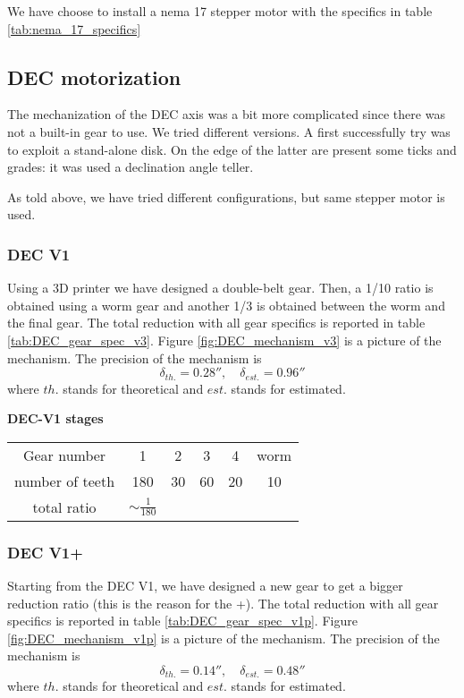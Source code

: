 We have choose to install a nema 17 stepper motor with the specifics in table \ref{tab:nema_17_specifics}

\subsection{DEC motorization}
The mechanization of the DEC axis was a bit more complicated since there was not a built-in gear to use.
We tried different versions.
A first successfully try was to exploit a stand-alone disk.
On the edge of the latter are present some ticks and grades: it was used a declination angle teller.

As told above, we have tried different configurations, but same stepper motor is used.

\subsubsection{DEC V1}
Using a 3D printer we have designed a double-belt gear.
Then, a 1/10 ratio is obtained using a worm gear and another 1/3 is obtained between the worm and the final gear.
The total reduction with all gear specifics is reported in table \ref{tab:DEC_gear_spec_v3}.
Figure \ref{fig:DEC_mechanism_v3} is a picture of the mechanism.
The precision of the mechanism is 
\[\delta_{th.}=0.28'',\quad \delta_{est.}=0.96''\]
where \(th.\) stands for theoretical and \(est.\) stands for estimated.

\begin{minipage}
    {0.5\textwidth}
    \textbf{DEC-V1 stages}\\
    \centering
    \begin{tabular}{cccccc}
        \hline
        Gear number & 1 & 2 & 3 & 4 & worm\\
        number of teeth & 180 & 30 & 60 & 20 & 10\\
        \hline
        total ratio & \(\sim \frac{1}{180}\) &&&
    \end{tabular}
    \label{tab:DEC_gear_spec_v3}
\end{minipage}

\subsubsection{DEC V1+}
Starting from the DEC V1, we have designed a new gear to get a bigger reduction ratio (this is the reason for the +).
The total reduction with all gear specifics is reported in table \ref{tab:DEC_gear_spec_v1p}.
Figure \ref{fig:DEC_mechanism_v1p} is a picture of the mechanism.
The precision of the mechanism is 
\[\delta_{th.}=0.14'',\quad \delta_{est.}=0.48''\]
where \(th.\) stands for theoretical and \(est.\) stands for estimated.

